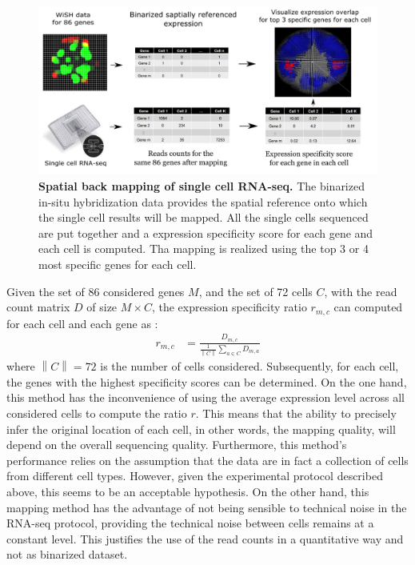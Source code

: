 	\begin{figure}[h]
\centerline{\includegraphics[width=1.5\linewidth]{gfx/chapter2/backmap.png}}
\caption{{\bf Spatial back mapping of single cell RNA-seq.} The binarized in-situ hybridization data provides the spatial reference onto which the single cell results will be mapped. All the single cells sequenced are put together and a expression specificity score for each gene and each cell is computed. Tha mapping is realized using the top 3 or 4 most specific genes for each cell.}\label{fig:backmap}
	\end{figure}
	
	Given the set of 86 considered genes $M$, and the set of 72 cells $C$, with the read count matrix $D$ of size $M\times C$, the expression specificity ratio $r_{m,c}$ can computed for each cell and each gene as :
\begin{eqnarray*}
	r_{m,c} &= \frac{D_{m,c}}{\frac{1}{\left\|C\right\|}\sum_{a \in C}D_{m,a}}
\end{eqnarray*}
where $\left\|C\right\| = 72 $ is the number of cells considered. Subsequently, for each cell, the genes with the highest specificity scores can be determined. On the one hand, this method has the inconvenience of using the average expression level across all considered cells to compute the ratio $r$. This means that the ability to precisely infer the original location of each cell, in other words, the mapping quality, will depend on the overall sequencing quality. Furthermore, this method's performance relies on the assumption that the data are in fact a collection of cells from different cell types. However, given the experimental protocol described above, this seems to be an acceptable hypothesis. On the other hand, this mapping method has the advantage of not being sensible to technical noise in the RNA-seq protocol, providing the technical noise between cells remains at a constant level. This justifies the use of the read counts in a quantitative way and not as binarized dataset.\\

